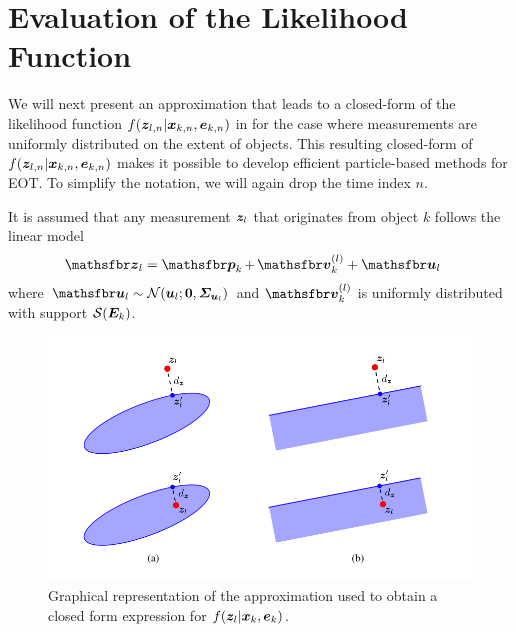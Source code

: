 \documentclass[11pt,a4paper]{article}
\newcommand{\rmv}{\hspace*{-.3mm}}
\begin{document}
\section{Evaluation of the Likelihood Function}
\label{sec:approxLikelihood}

We will next present an approximation that leads to a closed-form of the likelihood function $f(\bm{z}_{l,n} | \bm{x}_{k,n}, \bm{e}_{k,n})$ in \cite[Eq.~6]{MeyWil:J21} for the case where measurements are uniformly distributed on the extent of objects. This resulting closed-form of $f(\bm{z}_{l,n} | \bm{x}_{k,n}, \bm{e}_{k,n})$ makes it possible to develop efficient particle-based methods for EOT. To simplify the notation, we will again drop the time index $n$. 

It is assumed that any measurement $\bm{z}_l$ that originates from object $k$ follows the linear\vspace{-1mm} model
\begin{align}
\RV{z}_{l} &= \RV{p}_{k} \rmv+\rmv \RV{v}^{(l)}_{k} + \RV{u}_{l} \label{eq:measModelLin}
\vspace{-1mm}
\end{align}
where $\RV{u}_{l} \sim \mathcal{N}(\V{u}_{l} ;\V{0},\M{\Sigma}_{\V{u}_{l}})$ and $\RV{v}^{(l)}_{k}$ is uniformly distributed with support $\Set{S}(\M{E}_{k})$. 

\begin{figure}[t!]
\centering
\includegraphics[scale=1]{./Figures/likelihoodApproximation.pdf}
\vspace{-5mm}
\caption{Graphical representation of the approximation used to obtain a closed form expression for $f(\bm{z}_{l} | \bm{x}_{k}, \bm{e}_{k})$.}
\label{fig:likelihoodApproximation}
\end{figure}
\end{document}
